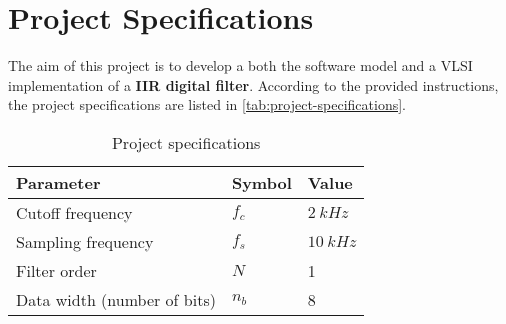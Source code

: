 \section{Project Specifications}
The aim of this project is to develop a both the software model and a VLSI implementation of a \textbf{IIR digital filter}. According to the provided instructions, the project specifications are listed in \autoref{tab:project-specifications}.
\begin{table}[htbp]
	\center
	\begin{tabular}{|l l l|}
		\hline
        \textbf{Parameter} & \textbf{Symbol} & \textbf{Value} \\ \hline
        Cutoff frequency & $f_c$ & $\SI{2}{kHz}$ \\ \hline
        Sampling frequency & $f_s$ & $\SI{10}{kHz}$ \\ \hline
        Filter order & $N$ & 1 \\ \hline
        Data width (number of bits) & $n_b$ & 8 \\
		\hline
	\end{tabular}
	\caption{Project specifications}
	\label{tab:project-specifications}
\end{table}
